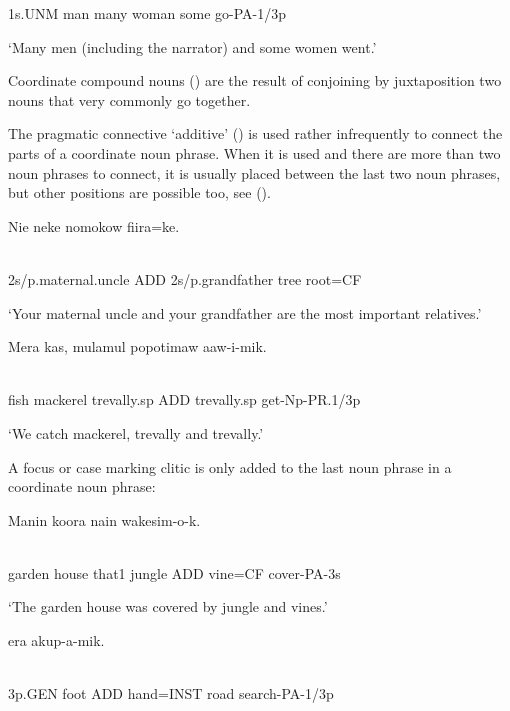 1s.UNM  man  many  woman  some  go-PA-1/3p

`Many men (including the narrator) and some women went.'

Coordinate compound nouns () are the result of conjoining by juxtaposition two nouns that very commonly go together. 

The pragmatic connective  `additive' () is used rather infrequently to connect the parts of a coordinate noun phrase. When it is used and there are more than two noun phrases to connect, it is usually placed between the last two noun phrases, but other positions are possible too, see (). 

\ea%
\label{ex:x812}
\gll Nie    neke  nomokow  fiira=ke. \\
      \\
\glt
\z

2s/p.maternal.uncle  ADD  2s/p.grandfather  tree  root=CF

`Your maternal uncle and your grandfather are the most important relatives.'

\ea%
\label{ex:x814}
\gll Mera  kas,  mulamul    popotimaw  aaw-i-mik. \\
      \\
\glt
\z

fish  mackerel  trevally.sp  ADD  trevally.sp  get-Np-PR.1/3p

`We catch mackerel,   trevally and   trevally.'

A focus or case marking clitic is only added to the last noun phrase in a coordinate noun phrase:

\ea%
\label{ex:x893}
\gll Manin  koora  nain    wakesim-o-k. \\
      \\
\glt
\z

garden  house  that1  jungle  ADD  vine=CF  cover-PA-3s

`The garden house was covered by jungle and vines.'

\ea%
\label{ex:x894}
\gll {}  era  akup-a-mik. \\
      \\
\glt
\z

3p.GEN  foot  ADD  hand=INST  road  search-PA-1/3p

